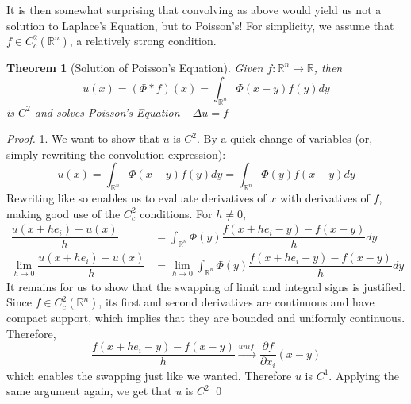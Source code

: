 \documentclass[openany, amssymb, psamsfonts]{amsart}
\newtheorem{thm}{Theorem}[section]
\theoremstyle{definition}
\numberwithin{equation}{section}
\newcommand{\bbr}{\mathbb{R}}
\begin{document}
It is then somewhat surprising that convolving as above would yield us not a solution to Laplace's Equation, but to Poisson's! For simplicity, we assume that $f \in C^2_c(\bbr^n)$, a relatively strong condition.
\begin{thm} [Solution of Poisson's Equation]
    Given $f: \bbr^n \to \bbr$, then
    \begin{equation} \label{poisson_sln}
        u(x) = (\Phi * f)(x) = \int_{\bbr^n} \Phi(x -y) f(y) dy
    \end{equation}
    is $C^2$ and solves Poisson's Equation $-\Delta u = f$
\end{thm}
\begin{proof}
    1. We want to show that $u$ is $C^2$. By a quick change of variables (or, simply rewriting the convolution expression): \begin{equation*}
        u(x) = \int_{\bbr^n} \Phi(x -y) f(y) dy = \int_{\bbr^n} \Phi(y) f(x-y) dy
    \end{equation*}
    Rewriting like so enables us to evaluate derivatives of $x$ with derivatives of $f$, making good use of the $C^2_c$ conditions. For $h \neq 0$, \begin{align*}
        \dfrac{u(x + he_i) - u(x)}{h} &= \int_{\bbr^n} \Phi (y) \dfrac{f(x + he_i  -y) - f(x -y)}{h} dy \\
        \lim_{h \to 0} \dfrac{u(x + he_i) - u(x)}{h} &= \lim_{h \to 0} \int_{\bbr^n} \Phi (y) \dfrac{f(x + he_i  -y) - f(x -y)}{h} dy
    \end{align*}
    It remains for us to show that the swapping of limit and integral signs is justified. Since $f \in C^2_c(\bbr^n)$, its first and second derivatives are continuous and have compact support, which implies that they are bounded and uniformly continuous. Therefore, \[
    \dfrac{f( x + he_i - y) - f(x -y)} {h} \xrightarrow{unif.} \dfrac{\partial f}{\partial x_i} (x -y)
    \]
    which enables the swapping just like we wanted. Therefore $u$ is $C^1$. Applying the same argument again, we get that $u$ is $C^2$ \qed


\end{proof}
\end{document}

